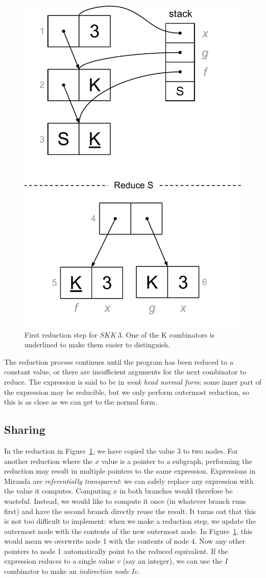 \documentclass[conference]{IEEEtran}
\begin{document}
\begin{figure}
    \includegraphics[width=.51\columnwidth]{skk3_sred}
    \centering
    \caption{
        First reduction step for $SKK \ 3$.
        One of the K combinators is underlined to make them easier to distinguish.
    }
    \label{fig:skk3_sred}
\end{figure}

The reduction process continues until the program has been reduced to a constant value, or there are insufficient arguments for the next combinator to reduce.
The expression is said to be in \textit{weak head normal form}: some inner part of the expression may be reducible, but we only perform outermost reduction, so this is as close as we can get to the normal form.

\subsection{Sharing}
In the reduction in Figure~\ref{fig:skk3_sred}, we have copied the value $3$ to two nodes.
For another reduction where the $x$ value is a pointer to a subgraph, performing the reduction may result in multiple pointers to the same expression.
Expressions in Miranda are \textit{referentially transparent}: we can safely replace any expression with the value it computes.
Computing $x$ in both branches would therefore be wasteful.
Instead, we would like to compute it once (in whatever branch runs first) and have the second branch directly reuse the result.
It turns out that this is not too difficult to implement: when we make a reduction step, we update the outermost node with the contents of the new outermost node.
In Figure~\ref{fig:skk3_sred}, this would mean we overwrite node 1 with the contents of node 4.
Now any other pointers to node 1 automatically point to the reduced equivalent.
If the expression reduces to a single value $v$ (say an integer), we can use the $I$ combinator to make an \textit{indirection node} $I v$.
\end{document}
